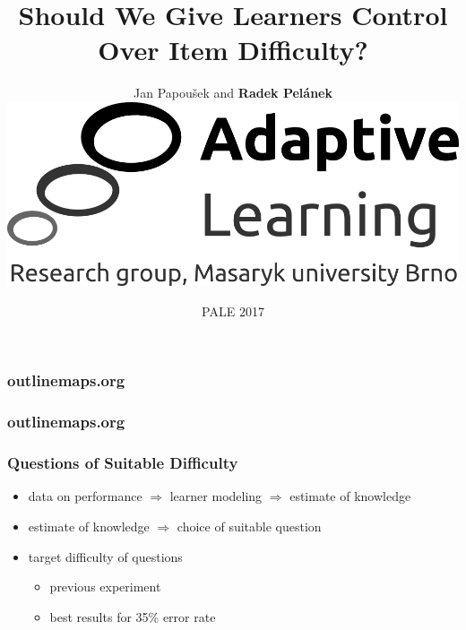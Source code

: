 \documentclass[bigger]{beamer}
\title{Should We Give Learners Control Over Item Difficulty?}
\author{Jan Papou\v{s}ek and \textbf{Radek Pel\'anek}\\[10mm]
\includegraphics[width=.3\linewidth]{al-logo}
}
\date{PALE 2017}
\begin{document}
\frame{\titlepage}

\begin{frame}
  \frametitle{outlinemaps.org}
	\noindent{}
\end{frame}

\begin{frame}
  \frametitle{outlinemaps.org}
	\noindent{}
\end{frame}

\begin{frame}
  \frametitle{Questions of Suitable Difficulty}

  \begin{itemize}
  \item data on performance $\Rightarrow$ learner modeling $\Rightarrow$
    estimate of knowledge
  \item estimate of knowledge $\Rightarrow$ choice of suitable question
  \item target difficulty of questions
    \begin{itemize}
    \item previous experiment
    \item best results for 35\% error rate
    \end{itemize}
  \end{itemize}
\end{frame}
\end{document}
